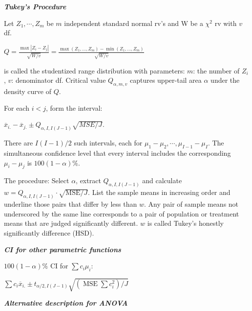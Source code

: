 \documentclass{article}
\newcommand{\smalltitle}[1]{
	\noindent
	\textbf{\textit{#1}}
}
\begin{document}
	
	
	
	
	\smalltitle{Tukey's Procedure}
	
	Let $Z_1, \cdots, Z_m$ be $m$ independent standard normal rv's and W be a $\chi^2$ rv with $v$ df.
	
	$Q = \frac { \max \left| Z _ { i } - Z _ { j } \right| } { \sqrt { W / v } } = \frac { \max \left( Z _ { 1 } , \ldots , Z _ { m } \right) - \min \left( Z _ { 1 } , \ldots , Z _ { m } \right) } { \sqrt { W / v } }$
	
	is called the studentized range distribution with parameters: $m$: the number of $Z_i$, $v$: denominator df. Critical value $Q_{\alpha,m,v}$ captures upper-tail area $\alpha$ under the density curve of $Q$.
	
	For each $i<j$, form the interval:
	
	
	$\overline { x } _ { i . } - \overline { x } _ { j . } \pm Q _ { \alpha , I , I ( J - 1 ) } \sqrt { MSE / J }$. 
	
	
	There are $I(I-1)/2$ such intervals, each for $\mu_1-\mu_2, \cdots, \mu_{I-1} - \mu_I$. The simultaneous confidence level that every interval includes the corresponding $\mu_i-\mu_j$ is $100(1-\alpha)\%$.
	
	The procedure: Select $\alpha$, extract $Q_{\alpha,I,I(J-1)}$ and calculate $w=Q_{\alpha,I,I(J-1)}\cdot\sqrt{\mathrm{ MSE }/J}$. List the sample means in increasing order and underline those pairs that differ by less than $w$. Any pair of sample means not underscored by the same line corresponds to a pair of population or treatment means that are judged significantly different. $w$ is called Tukey's honestly significantly difference (HSD).
	
	\smalltitle{CI for other parametric functions}
	
	$100(1-\alpha)\%$ CI for $\sum c _ { i } \mu _ { i }$:
	
	$\sum c _ { i } \overline { x } _ { i . } \pm t _ { \alpha / 2 , I ( J - 1 ) } \sqrt { \left( \operatorname { MSE } \sum c _ { i } ^ { 2 } \right) / J }$
	
	
	\smalltitle{Alternative description for ANOVA}
	
	
\end{document}
